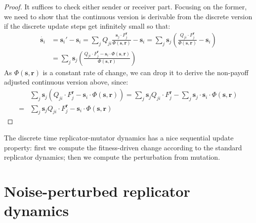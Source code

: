 \documentclass[fleqn,reqno,10pt]{article}
\renewcommand{\Smixed}{\ensuremath{\mathrm{\mathbf{s}}}}
\renewcommand{\Rmixed}{\ensuremath{\mathrm{\mathbf{r}}}}
\begin{document}
\begin{proof}
  It suffices to check either sender or receiver part. Focusing on the
  former, we need to show that the continuous version is derivable
  from the discrete version if the discrete update steps get
  infinitely small so that:
  \begin{align*}
    \dot{\Smixed_i} & = \Smixed_i' - \Smixed_i = \sum_{j} Q_{ji}
    \frac{\Smixed_j \cdot F_j^{\Rmixed}}{ \Phi(\Smixed,\Rmixed)} -
    \Smixed_i = \sum_{j} \Smixed_j \left ( \frac{ Q_{ji} \cdot
        F_j^{\Rmixed}}{ \Phi(\Smixed,\Rmixed)} - \Smixed_i \right ) \\
    & = \sum_{j} \Smixed_j \left ( \frac{ Q_{ji} \cdot
        F_j^{\Rmixed} - \Smixed_i \cdot \Phi(\Smixed,\Rmixed)}{ \Phi(\Smixed,\Rmixed)}  \right )
  \end{align*}
  As $\Phi(\Smixed,\Rmixed)$ is a constant rate of change, we can drop
  it to derive the non-payoff adjusted continuous version above,
  since:
  \begin{align*}
    & \sum_{j} \Smixed_j \left ( Q_{ji} \cdot
        F_j^{\Rmixed} - \Smixed_i \cdot \Phi(\Smixed,\Rmixed)  \right
      ) =     \sum_{j} \Smixed_j  Q_{ji} \cdot
        F_j^{\Rmixed} - \sum_{j} \Smixed_j \cdot \Smixed_i \cdot
        \Phi(\Smixed,\Rmixed) \\
       = &    \sum_{j} \Smixed_j  Q_{ji} \cdot
        F_j^{\Rmixed} - \Smixed_i \cdot
        \Phi(\Smixed,\Rmixed) 
  \end{align*}
\end{proof}

The discrete time replicator-mutator dynamics has a nice sequential
update property: first we compute the fitness-driven change according
to the standard replicator dynamics; then we compute the perturbation
from mutation.

\section{Noise-perturbed replicator dynamics}
\end{document}
